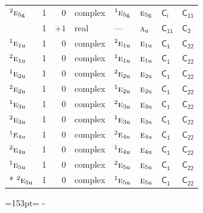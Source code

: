 \documentclass[10pt,a4paper]{article}
\newcommand{\needspace}[1]{\par\penalty-100\begingroup\dimen0=#1\relax\dimen2=\pagegoal
  \advance\dimen2-\pagetotal\ifdim\dimen0>\dimen2\relax\ifdim\dimen2>0pt\vfil\break\fi\fi
  \endgroup}
\numberwithin{equation}{section}
\newcommand{\grp}[1]{\mathsf{#1}}
\newcommand{\irr}[1]{\text{\normalfont\scshape #1}}
\newcommand{\conjpair}[1]{{}^{#1}}
\newcommand{\detbox}[1]{{\setlength{\fboxsep}{1pt}\fbox{#1}}}
\newcommand{\ptag}[1]{\mathrm{#1}}
\begin{document}
{\begin{longtable}{@{}lrrlllll@{}}
$\conjpair{2}\irr{e}_{5\ptag{g}}$ & 1 & $0$ & complex & $\conjpair{1}\irr{e}_{5\ptag{g}}$ & $\irr{e}_{5\ptag{g}}$ & \href{S2.pdf}{$\grp{C_{i}}$} & \href{../../../rotation/data/pdf/C11.pdf}{$\grp{C_{11}}$}\\
\detbox{$\irr{a}_{\ptag{u}}$} & 1 & $+1$ & real & --- & $\irr{a}_{\ptag{u}}$ & \href{C11.pdf}{$\grp{C_{11}}$} & \href{../../../rotation/data/pdf/C2.pdf}{$\grp{C_{2}}$}\\
$\conjpair{1}\irr{e}_{1\ptag{u}}$ & 1 & $0$ & complex & $\conjpair{2}\irr{e}_{1\ptag{u}}$ & $\irr{e}_{1\ptag{u}}$ & \href{C1.pdf}{$\grp{C_{1}}$} & $\grp{C_{22}}$\\
$\conjpair{2}\irr{e}_{1\ptag{u}}$ & 1 & $0$ & complex & $\conjpair{1}\irr{e}_{1\ptag{u}}$ & $\irr{e}_{1\ptag{u}}$ & \href{C1.pdf}{$\grp{C_{1}}$} & $\grp{C_{22}}$\\
$\conjpair{1}\irr{e}_{2\ptag{u}}$ & 1 & $0$ & complex & $\conjpair{2}\irr{e}_{2\ptag{u}}$ & $\irr{e}_{2\ptag{u}}$ & \href{C1.pdf}{$\grp{C_{1}}$} & $\grp{C_{22}}$\\
$\conjpair{2}\irr{e}_{2\ptag{u}}$ & 1 & $0$ & complex & $\conjpair{1}\irr{e}_{2\ptag{u}}$ & $\irr{e}_{2\ptag{u}}$ & \href{C1.pdf}{$\grp{C_{1}}$} & $\grp{C_{22}}$\\
$\conjpair{1}\irr{e}_{3\ptag{u}}$ & 1 & $0$ & complex & $\conjpair{2}\irr{e}_{3\ptag{u}}$ & $\irr{e}_{3\ptag{u}}$ & \href{C1.pdf}{$\grp{C_{1}}$} & $\grp{C_{22}}$\\
$\conjpair{2}\irr{e}_{3\ptag{u}}$ & 1 & $0$ & complex & $\conjpair{1}\irr{e}_{3\ptag{u}}$ & $\irr{e}_{3\ptag{u}}$ & \href{C1.pdf}{$\grp{C_{1}}$} & $\grp{C_{22}}$\\
$\conjpair{1}\irr{e}_{4\ptag{u}}$ & 1 & $0$ & complex & $\conjpair{2}\irr{e}_{4\ptag{u}}$ & $\irr{e}_{4\ptag{u}}$ & \href{C1.pdf}{$\grp{C_{1}}$} & $\grp{C_{22}}$\\
$\conjpair{2}\irr{e}_{4\ptag{u}}$ & 1 & $0$ & complex & $\conjpair{1}\irr{e}_{4\ptag{u}}$ & $\irr{e}_{4\ptag{u}}$ & \href{C1.pdf}{$\grp{C_{1}}$} & $\grp{C_{22}}$\\
$\conjpair{1}\irr{e}_{5\ptag{u}}$ & 1 & $0$ & complex & $\conjpair{2}\irr{e}_{5\ptag{u}}$ & $\irr{e}_{5\ptag{u}}$ & \href{C1.pdf}{$\grp{C_{1}}$} & $\grp{C_{22}}$\\*
$\conjpair{2}\irr{e}_{5\ptag{u}}$ & 1 & $0$ & complex & $\conjpair{1}\irr{e}_{5\ptag{u}}$ & $\irr{e}_{5\ptag{u}}$ & \href{C1.pdf}{$\grp{C_{1}}$} & $\grp{C_{22}}$\\
\bottomrule\end{longtable}}
\needspace{153pt}
\end{document}
